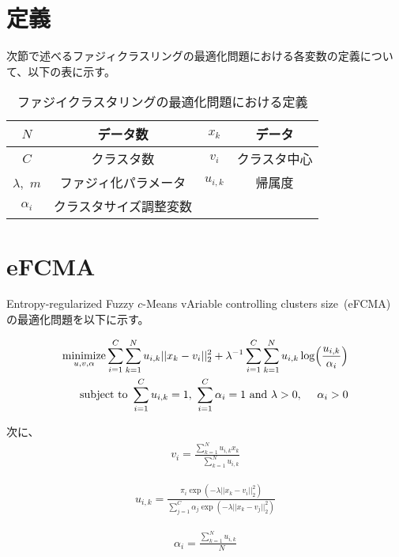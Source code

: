 \documentclass[a4j,12pt,dvipdfmx,oneside]{jsbook}
\theoremstyle{definition}
\begin{document}
\section{定義}\label{sec:suggest_method_define}
%
次節で述べるファジィクラスリングの最適化問題における各変数の定義について、以下の表に示す。
 \begin{table}[htbp]
  \caption{ファジイクラスタリングの最適化問題における定義}
 \begin{center}
  \begin{tabular}{c|c||c|c} \hline
   {$N$}&データ数&{$x_k$}&データ \\ \hline
   {$C$}&クラスタ数&{$v_i$}&クラスタ中心\\ \hline
   {$\lambda$,~$m$}&ファジィ化パラメータ&{$u_{i,k}$}&帰属度 \\ \hline
   {$\alpha_i$}&クラスタサイズ調整変数\\ \hline
  \end{tabular}
 \end{center}
  \label{tab:fuzzy_c_define}
 \end{table}

\section{eFCMA}\label{sec:efcma}
%
Entropy-regularized Fuzzy $c$-Means vAriable controlling clusters size~(eFCMA)~\cite{eFCMA}
の最適化問題を以下に示す。

\begin{align}
 \underset{u,v,\alpha}{\text{minimize}}
    \sum_{i=1}^C\sum_{k=1}^Nu_{i,k}||x_k-v_i||_2^2+\lambda^{-1}\sum_{i=1}^C\sum_{k=1}^Nu_{i,k}\log\Bigl(\frac{u_{i,k}}{\alpha_{i}}\Bigl)\\
    {\text{subject to }}\sum_{i=1}^Cu_{i,k}=1,~\sum_{i=1}^C\alpha_{i}=1{\text{ and }}\lambda>0,~\quad\alpha_{i}>0
\end{align}

次に、
\begin{align}
    v_{i}=\frac{\sum_{k=1}^Nu_{i,k}x_{k}}{\quad\sum_{k=1}^Nu_{i,k}}
\end{align}

\begin{align}
    u_{i,k}=\frac{\pi_{i}\exp(-\lambda||x_k-v_i||_2^2)}{\sum_{j=1}^C\alpha_{j}\exp(-\lambda||x_k-v_j||_2^2)}
\end{align}

\begin{align}
    \alpha_{i}=\frac{\sum_{k=1}^Nu_{i,k}}{\quad N}
\end{align}
\end{document}
